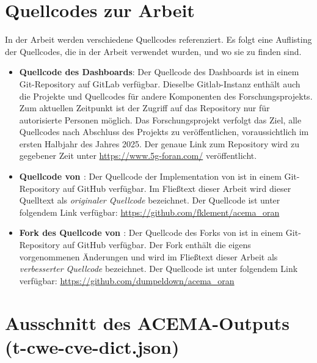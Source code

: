 \chapter{Quellcodes zur Arbeit}
\label{app:sourcecode}
In der Arbeit werden verschiedene Quellcodes referenziert. Es folgt eine Auflisting der Quellcodes, die in der Arbeit verwendet wurden, und wo sie zu finden sind.
\begin{itemize}
    \item \textbf{Quellcode des Dashboards}: Der Quellcode des Dashboards ist in einem Git-Repository auf GitLab verfügbar. Dieselbe Gitlab-Instanz enthält auch die Projekte und Quellcodes für andere Komponenten des Forschungsprojekts. Zum aktuellen Zeitpunkt ist der Zugriff auf das Repository nur für autorisierte Personen möglich. Das Forschungsprojekt verfolgt das Ziel, alle Quellcodes nach Abschluss des Projekts zu veröffentlichen, voraussichtlich im ersten Halbjahr des Jahres 2025. Der genaue Link zum Repository wird zu gegebener Zeit unter \url{https://www.5g-foran.com/} veröffentlicht.
    \item \textbf{Quellcode von \citeauthor{klementSecuring6GTransition2024}}: Der Quellcode der Implementation von \citeauthor{klementSecuring6GTransition2024} ist in einem Git-Repository auf GitHub verfügbar. Im Fließtext dieser Arbeit wird dieser Quelltext als \textit{originaler Quellcode} bezeichnet. Der Quellcode ist unter folgendem Link verfügbar: \url{https://github.com/fklement/acema_oran}
    \item \textbf{Fork des Quellcode von \citeauthor{klementSecuring6GTransition2024}}: Der Quellcode des Forks von \citeauthor{klementSecuring6GTransition2024} ist in einem Git-Repository auf GitHub verfügbar. Der Fork enthält die eigens vorgenommenen Änderungen und wird im Fließtext dieser Arbeit als \textit{verbesserter Quellcode} bezeichnet. Der Quellcode ist unter folgendem Link verfügbar: \url{https://github.com/dumpeldown/acema_oran}
\end{itemize}

\label{app:attack-szenarien}

\chapter{Ausschnitt des ACEMA-Outputs (t-cwe-cve-dict.json)}
\label{app:acema-output}

\restoregeometry
